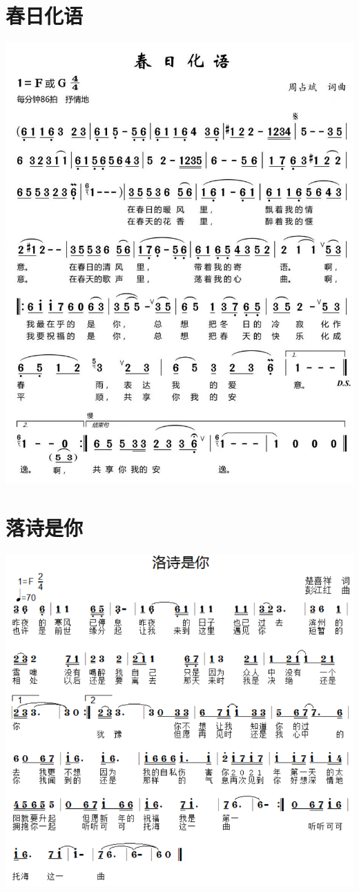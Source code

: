 \documentclass[cn,pad,twocol]{elegantbook}
\begin{document}
\section{春日化语} \includegraphics[width=\textwidth]{macos/20210208春日化语.jpg}
\section{落诗是你} \includegraphics[width=\textwidth]{macos/20210208落诗是你.png}
\end{document}
